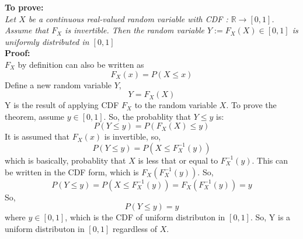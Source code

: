 \begin{solution}
	\textbf{To prove: }\\
	\emph{Let $X$ be a continuous real-valued random variable with CDF  : $\mathbb{R} \rightarrow [0, 1]$. Assume that
	$F_X$ is invertible. Then the random variable $Y := F_X (X) \in [0, 1]$ is uniformly distributed in $[0, 1]$}\\
	\textbf{Proof:}\\
	$F_X$ by definition can also be written as
	\[F_X(x) = P(X\leq x)\]
	Define a new random variable $Y$,
	\[Y =F_X(X) \]
	Y is the result of applying CDF $F_X$ to the random variable $X$.
	To prove the theorem, assume $y\in [0,1]$. So, the probablity that $Y \leq y$ is:
	\[P(Y\leq y) = P(F_X(X)\leq y)\]
	It is assumed that $F_X(x)$ is invertible, so,
	\[P(Y\leq y) = P(X\leq F_X^{-1}(y))\]
	which is basically, probablity that $X$ is less that or equal to $F_X^{-1}(y)$. This can be written in the CDF form, which is $F_X(F_X^{-1}(y))$. So,
	\[P(Y\leq y) = P(X\leq F_X^{-1}(y)) = F_X(F_X^{-1}(y)) = y\]
	So,
	\[P(Y\leq y) = y\]
	where $y\in [0,1]$, which is the CDF of uniform distributon in $[0,1]$.
	So, Y is a uniform distributon in $[0,1]$ regardless of $X$.

	
\end{solution}
